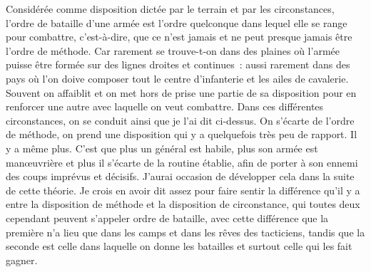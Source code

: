 \documentclass[french,twoside]{book} %
\begin{document}
Considérée comme disposition dictée par le terrain et par les circonstances, l’ordre de bataille d’une armée est l’ordre quelconque dans lequel elle se range pour combattre, c’est-à-dire, que ce n’est jamais et ne peut presque jamais être l’ordre de méthode. Car rarement se trouve-t-on dans des plaines où l’armée puisse être formée sur des lignes droites et continues : aussi rarement dans des pays où l’on doive composer tout le centre d’infanterie et les ailes de cavalerie. Souvent on affaiblit et on met hors de prise une partie de sa disposition pour en renforcer une autre avec laquelle on veut combattre. Dans ces différentes circonstances, on se conduit ainsi que je l’ai dit ci-dessus. On s’écarte de l’ordre de méthode, on prend une disposition qui y a quelquefois très peu de rapport. Il y a même plus. C’est que plus un général est habile, plus son armée est manœuvrière et plus il s’écarte de la routine établie, afin de porter à son ennemi des coups imprévus et décisifs. J’aurai occasion de développer cela dans la suite de cette théorie. Je crois en avoir dit assez pour faire sentir la différence qu’il y a entre la disposition de méthode et la disposition de circonstance, qui toutes deux cependant peuvent s’appeler ordre de bataille, avec cette différence que la première n’a lieu que dans les camps et dans les rêves des tacticiens, tandis que la seconde est celle dans laquelle on donne les batailles et surtout celle qui les fait gagner.\par
\end{document}
